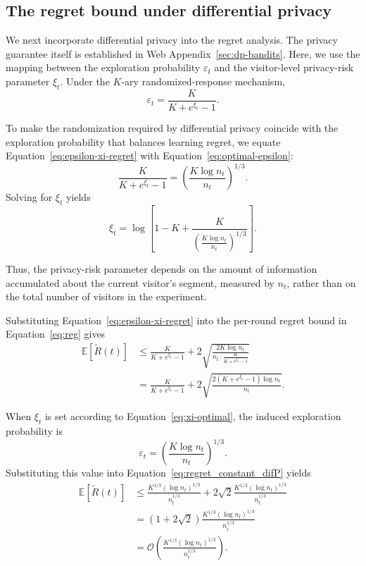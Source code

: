 \documentclass[mksc,nonblindrev]{informs3}
\begin{document}
\begin{APPENDICES}
\subsection{The regret bound under differential privacy}
\label{web:regret_difprivacy}
We next incorporate differential privacy into the regret analysis. The privacy guarantee itself is established in Web Appendix~\ref{sec:dp-bandits}. Here, we use the mapping between the exploration probability $\varepsilon_t$ and the visitor-level privacy-risk parameter $\xi_t$. Under the $K$-ary randomized-response mechanism,
\begin{equation}
\label{eq:epsilon-xi-regret}
\varepsilon_t
=
\frac{K}
{K+e^{\xi_t}-1}.
\end{equation}

To make the randomization required by differential privacy coincide with the
exploration probability that balances learning regret, we equate
Equation~\eqref{eq:epsilon-xi-regret} with
Equation~\eqref{eq:optimal-epsilon}:
\begin{equation}
\frac{K}
{K+e^{\xi_t}-1}
=
\left(
\frac{K\log n_t}{n_t}
\right)^{1/3}.
\end{equation}
Solving for $\xi_t$ yields
\begin{equation}
\label{eq:xi-optimal}
\xi_t
=
\log\left[
1-K
+
\frac{K}{
\left(
\frac{K\log n_t}{n_t}
\right)^{1/3}
}
\right].
\end{equation}

Thus, the privacy-risk parameter depends on the amount of information
accumulated about the current visitor's segment, measured by $n_t$, rather
than on the total number of visitors in the experiment.

Substituting Equation~\eqref{eq:epsilon-xi-regret} into the per-round regret
bound in Equation~\eqref{eq:reg} gives
\begin{align}
\mathbb E[\widetilde R(t)]
&\leq
\frac{K}
{K+e^{\xi_t}-1}
+
2
\sqrt{
\frac{
2K\log n_t
}{
n_t\cdot
\frac{K}{K+e^{\xi_t}-1}
}
}
\nonumber\\
&=
\frac{K}
{K+e^{\xi_t}-1}
+
2
\sqrt{
\frac{
2(K+e^{\xi_t}-1)\log n_t
}{
n_t
}
}.
\label{eq:regret_constant_difP}
\end{align}

When $\xi_t$ is set according to Equation~\eqref{eq:xi-optimal}, the induced
exploration probability is
\[
\varepsilon_t
=
\left(
\frac{K\log n_t}{n_t}
\right)^{1/3}.
\]
Substituting this value into Equation~\eqref{eq:regret_constant_difP} yields
\begin{align}
\mathbb E[\widetilde R(t)]
&\leq
\frac{
K^{1/3}(\log n_t)^{1/3}
}{
n_t^{1/3}
}
+
2\sqrt{2}
\frac{
K^{1/3}(\log n_t)^{1/3}
}{
n_t^{1/3}
}
\nonumber\\
&=
(1+2\sqrt{2})
\frac{
K^{1/3}(\log n_t)^{1/3}
}{
n_t^{1/3}
}
\nonumber\\
&=
\mathcal O\left(
\frac{
K^{1/3}(\log n_t)^{1/3}
}{
n_t^{1/3}
}
\right).
\end{align}


\end{APPENDICES}
\end{document}
